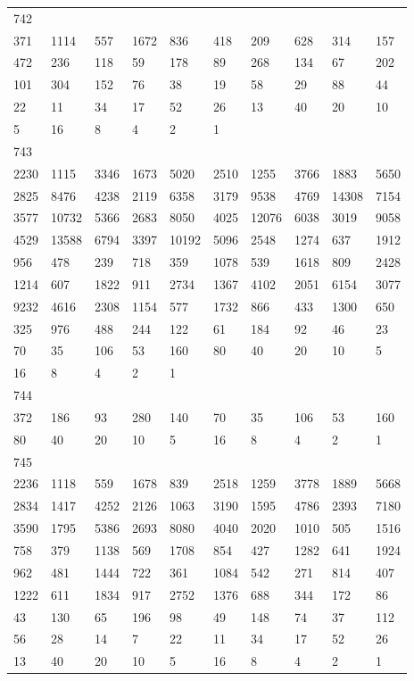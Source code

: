 \begin{longtable}{*{10}{l}}
742&&&&&&&&&\\
371& 1114& 557& 1672& 836& 418& 209& 628& 314& 157\\
472& 236& 118& 59& 178& 89& 268& 134& 67& 202\\
101& 304& 152& 76& 38& 19& 58& 29& 88& 44\\
22& 11& 34& 17& 52& 26& 13& 40& 20& 10\\
5& 16& 8& 4& 2& 1& \\

743&&&&&&&&&\\
2230& 1115& 3346& 1673& 5020& 2510& 1255& 3766& 1883& 5650\\
2825& 8476& 4238& 2119& 6358& 3179& 9538& 4769& 14308& 7154\\
3577& 10732& 5366& 2683& 8050& 4025& 12076& 6038& 3019& 9058\\
4529& 13588& 6794& 3397& 10192& 5096& 2548& 1274& 637& 1912\\
956& 478& 239& 718& 359& 1078& 539& 1618& 809& 2428\\
1214& 607& 1822& 911& 2734& 1367& 4102& 2051& 6154& 3077\\
9232& 4616& 2308& 1154& 577& 1732& 866& 433& 1300& 650\\
325& 976& 488& 244& 122& 61& 184& 92& 46& 23\\
70& 35& 106& 53& 160& 80& 40& 20& 10& 5\\
16& 8& 4& 2& 1& \\

744&&&&&&&&&\\
372& 186& 93& 280& 140& 70& 35& 106& 53& 160\\
80& 40& 20& 10& 5& 16& 8& 4& 2& 1\\

745&&&&&&&&&\\
2236& 1118& 559& 1678& 839& 2518& 1259& 3778& 1889& 5668\\
2834& 1417& 4252& 2126& 1063& 3190& 1595& 4786& 2393& 7180\\
3590& 1795& 5386& 2693& 8080& 4040& 2020& 1010& 505& 1516\\
758& 379& 1138& 569& 1708& 854& 427& 1282& 641& 1924\\
962& 481& 1444& 722& 361& 1084& 542& 271& 814& 407\\
1222& 611& 1834& 917& 2752& 1376& 688& 344& 172& 86\\
43& 130& 65& 196& 98& 49& 148& 74& 37& 112\\
56& 28& 14& 7& 22& 11& 34& 17& 52& 26\\
13& 40& 20& 10& 5& 16& 8& 4& 2& 1\\


\end{longtable}
